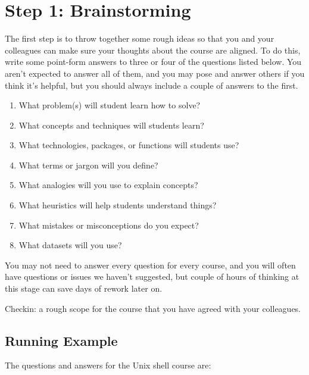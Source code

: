 \documentclass[10pt,statementpaper]{memoir}
\providecommand{\tightlist}{%
  \setlength{\itemsep}{0pt}\setlength{\parskip}{0pt}}
\begin{document}
\section{Step 1: Brainstorming}\label{step-1-brainstorming}

The first step is to throw together some rough ideas so that you and
your colleagues can make sure your thoughts about the course are
aligned. To do this, write some point-form answers to three or four of
the questions listed below. You aren't expected to answer all of them,
and you may pose and answer others if you think it's helpful, but you
should always include a couple of answers to the first.

\begin{enumerate}
\def\labelenumi{\arabic{enumi}.}
\tightlist
\item
  What problem(s) will student learn how to solve?
\item
  What concepts and techniques will students learn?
\item
  What technologies, packages, or functions will students use?
\item
  What terms or jargon will you define?
\item
  What analogies will you use to explain concepts?
\item
  What heuristics will help students understand things?
\item
  What mistakes or misconceptions do you expect?
\item
  What datasets will you use?
\end{enumerate}

You may not need to answer every question for every course, and you will
often have questions or issues we haven't suggested, but couple of hours
of thinking at this stage can save days of rework later on.

Checkin: a rough scope for the course that you have agreed with your
colleagues.

\subsection*{Running Example}\label{running-example}

The questions and answers for the Unix shell course are:
\end{document}

